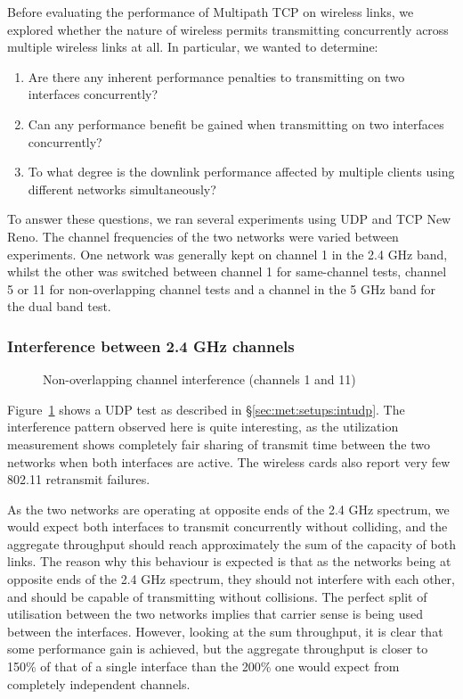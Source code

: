 Before evaluating the performance of Multipath TCP on wireless links, we
explored whether the nature of wireless permits transmitting
concurrently across multiple wireless links at all. In particular, we wanted
to determine:

\begin{enumerate}
  \item Are there any inherent performance penalties to transmitting on two
    interfaces concurrently?
  \item Can any performance benefit be gained when transmitting on two
    interfaces concurrently?
  \item To what degree is the downlink performance affected by multiple clients
    using different networks simultaneously?
\end{enumerate}

To answer these questions, we ran several experiments using UDP and TCP New 
Reno.
The channel frequencies of the two networks were varied between experiments. One
network was generally kept on channel 1 in the 2.4 GHz band, whilst the other
was switched between channel 1 for same-channel tests, channel 5 or 11 for
non-overlapping channel tests and a channel in the 5 GHz band for the dual band 
test. 

\subsubsection{Interference between 2.4 GHz channels}

\begin{figure}[h]
 \centering
 
 \caption{Non-overlapping channel interference (channels 1 and 11)}\label{graph:cc-interference}
\end{figure}

Figure~\ref{graph:cc-interference} shows a UDP test as described in 
\S\ref{sec:met:setups:intudp}.
The interference pattern observed here is quite interesting, as the
utilization measurement shows completely fair sharing of transmit time
between the two networks when both interfaces are active. The
wireless cards also report very few 802.11 retransmit failures.

As the two networks are operating at opposite ends of the 2.4 GHz spectrum, we
would expect both interfaces to transmit concurrently without colliding,
and the aggregate throughput should reach approximately the sum of the capacity of
both links. The reason why this behaviour is expected is that as the networks being at opposite ends of the 2.4 GHz spectrum, they should not interfere with each other, and
should be capable of transmitting without collisions. The perfect split of utilisation between the two networks implies that carrier sense is being used between the interfaces.
However, looking at the sum throughput, it is clear that some performance gain is
achieved, but the aggregate throughput is closer to 150\% of that of a single
interface than the 200\% one would expect from completely independent channels.

